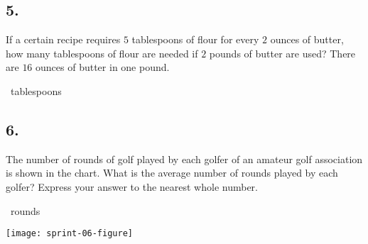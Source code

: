 \documentclass[12pt]{article}
\begin{document}
\subsection*{5.}
If a certain recipe requires $5$ tablespoons of flour for every $2$ ounces of butter, how many tablespoons of flour are needed if $2$ pounds of butter are used? There are $16$ ounces of butter in one pound. 

\nopagebreak

\fbox{\phantom{ANSWER}}~tablespoons

\begin{answer}
%
\end{answer}



\subsection*{6.}
The number of rounds of golf played by each golfer of an amateur golf association is shown in the chart. What is the average number of rounds played by each golfer? Express your answer to the nearest whole number. 

\nopagebreak

\fbox{\phantom{ANSWER}}~rounds

\begin{minipagex}[b]{\linewidth}
\centering
\texttt{[image: sprint-06-figure]}
\end{minipagex}
\end{document}
